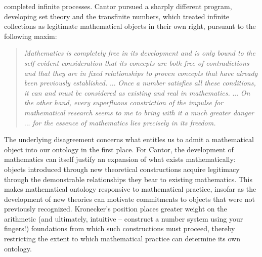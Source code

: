 \documentclass{article}
\begin{document}
completed infinite processes. Cantor pursued a sharply 
different program, developing set theory and the transfinite numbers, which treated infinite collections as legitimate 
mathematical objects in their own right, pursuant to the following maxim:
\begin{quote}
    \textit{Mathematics is completely free in its development and is only bound to the self-evident consideration that 
    its concepts are both free of contradictions and that they are in fixed relationships to proven concepts that have 
    already been previously established.} ... \textit{Once a number satisfies all these conditions, it can and must be 
    considered as existing and real in mathematics.} ... \textit{On the other hand, every superfluous constriction of the 
    impulse for mathematical research seems to me to bring with it a much greater danger} ... \textit{for the essence 
    of mathematics lies precisely in its freedom.} \textit{\parencite[\S~8]{cantor1883grundlagen}}
\end{quote}
The underlying disagreement concerns what entitles us to admit a mathematical object into our ontology in the first place. 
For Cantor, the development of mathematics can itself justify an expansion of what exists mathematically: objects introduced 
through new theoretical constructions acquire legitimacy through the demonstrable relationships they bear to existing 
mathematics. This makes mathematical ontology responsive to mathematical practice, insofar as the development of new 
theories can motivate commitments to objects that were not previously recognized. Kronecker's position places greater weight 
on the arithmetic (and ultimately, intuitive -- construct a number system using your fingers!) foundations from which such 
constructions must proceed, thereby restricting the extent to which mathematical practice can determine its own ontology.
\end{document}
